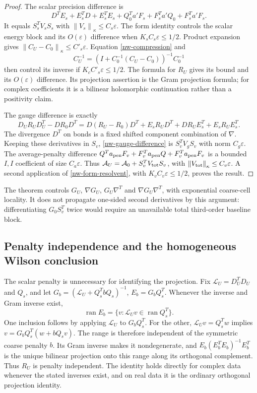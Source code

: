 \documentclass[11pt]{article}
\theoremstyle{remark}
\newcommand{\norm}[1]{\left\|#1\right\|}
\begin{document}
\begin{proof}
The scalar precision difference is
\[
 D^TE_s+E_s^TD+E_s^TE_s+
 Q_0^Ta'F_s+F_s^Ta'Q_0+F_s^Ta'F_s.
\]
It equals $S_s^TV_sS_s$ with $\norm{V_s}_\kappa\le C_s\varepsilon$.
The form identity controls the scalar energy block and its
$O(\varepsilon)$ difference when $K_sC_s\varepsilon\le1/2$.
Product expansion gives $\norm{C_U-C_0}_\kappa\le C'_s\varepsilon$.
Equation \eqref{nw-compression} and
\[
 C_U^{-1}=(I+C_0^{-1}(C_U-C_0))^{-1}C_0^{-1}
\]
then control its inverse if $K_cC'_s\varepsilon\le1/2$.
The formula for $R_U$ gives its bound and its
$O(\varepsilon)$ difference. Its projection assertion is the Gram
projection formula; for complex coefficients it is a bilinear
holomorphic continuation rather than a positivity claim.

The gauge difference is exactly
\begin{equation}\label{nw-gauge-difference}
 D_UR_UD_U^T-DR_0D^T
 =D(R_U-R_0)D^T+E_sR_UD^T+DR_UE_s^T+E_sR_UE_s^T.
\end{equation}
The divergence $D^T$ on bonds is a fixed shifted component
combination of $\nabla$. Keeping these derivatives in $S_v$,
\eqref{nw-gauge-difference} is $S_v^TV_gS_v$ with norm
$C_g\varepsilon$. The average-penalty difference
$Q^Ta_{\rm pen}F_v+F_v^Ta_{\rm pen}Q+F_v^Ta_{\rm pen}F_v$
is a bounded $I,I$ coefficient of size $C_a\varepsilon$.
Thus $\mathcal A_U=\mathcal A_0+S_v^TV_{\rm tot}S_v$,
with $\norm{V_{\rm tot}}_\kappa\le C_v\varepsilon$.
A second application of \eqref{nw-form-resolvent}, with
$K_vC_v\varepsilon\le1/2$, proves the result.
\end{proof}

The theorem controls $G_U$, $\nabla G_U$, $G_U\nabla^T$ and
$\nabla G_U\nabla^T$, with exponential coarse-cell locality.
It does not propagate one-sided second derivatives by this
argument: differentiating $G_0S_v^T$ twice would require an
unavailable total third-order baseline block.

\subsection{Penalty independence and the homogeneous Wilson conclusion}
\label{nw-conclusion}

The scalar penalty is unnecessary for identifying the projection.
Fix $\mathcal L_U=D_U^TD_U$ and $Q_s$, and let
$G_b=(\mathcal L_U+Q_s^TbQ_s)^{-1}$,
$E_b=G_bQ_s^T$. Whenever the inverse and Gram inverse exist,
\begin{equation}\label{nw-range}
 \operatorname{ran}E_b
   =\{v:\mathcal L_Uv\in\operatorname{ran}Q_s^T\}.
\end{equation}
One inclusion follows by applying $\mathcal L_U$ to $G_bQ_s^T$.
For the other, $\mathcal L_Uv=Q_s^Tw$ implies
$v=G_bQ_s^T(w+bQ_sv)$.
The range is therefore independent of the symmetric coarse penalty
$b$. Its Gram inverse makes it nondegenerate, and
$E_b(E_b^TE_b)^{-1}E_b^T$ is the unique bilinear projection
onto this range along its orthogonal complement. Thus $R_U$ is
penalty independent. The identity holds directly for complex data
whenever the stated inverses exist, and on real data it is the
ordinary orthogonal projection identity.
\end{document}
